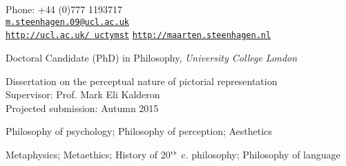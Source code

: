 \documentclass[11pt]{article}
\makeatletter
\def\myemail{m.steenhagen.09@ucl.ac.uk}
\def\myweb{http://ucl.ac.uk/\string~uctymst}
\def\myblog{http://maarten.steenhagen.nl}
\def\myphone{+44 (0)777 1193717}
\makeatother
\begin{document}
\begin{minipage}[t]{2.95in}
  
\end{minipage}
\hfill     
\hfill
\begin{minipage}[t]{1.7in}
  \flushright \footnotesize Phone: \myphone \\  
  {\scriptsize  \texttt{\href{mailto:\myemail}{\myemail}}} \\
  {\scriptsize  \texttt{\href{\myweb}{\myweb}}}
	{\scriptsize  \texttt{\href{\myblog}{\myblog}}}
\end{minipage}


\vfil

\reversemarginpar

\bigskip       

\medskip


\ind Doctoral Candidate (PhD) in Philosophy, \emph{University College London \vspace{0.01in}}

\ind Dissertation on the perceptual nature of pictorial representation\\ Supervisor: Prof. Mark Eli Kalderon\\Projected submission: Autumn 2015

\bigskip
\bigskip


\ind Philosophy of psychology; Philosophy of perception; Aesthetics

\bigskip
\bigskip


\ind Metaphysics; Metaethics; History of 20$^{\textrm{\tiny{th}}}$ c. philosophy; Philosophy of language

\bigskip
\bigskip
\vfil 
{}
\end{document}
